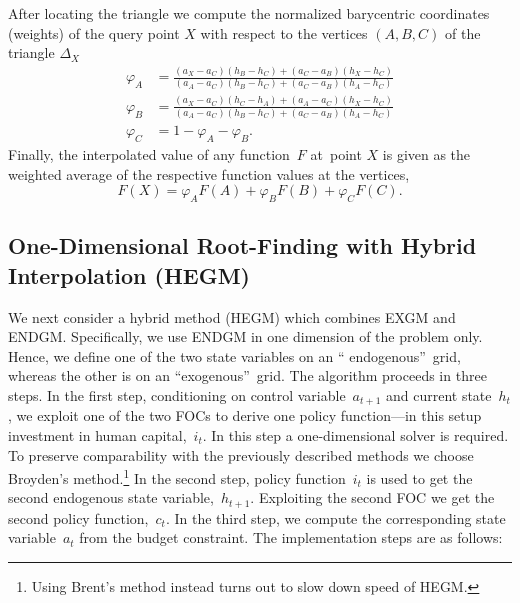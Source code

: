 \documentclass[a4paper,12pt]{article}%
\begin{document}
After locating the triangle we compute the normalized barycentric coordinates
(weights) of the query point $X$ with respect to the vertices $(A,B,C)$ of the
triangle $\Delta_{X}$%
\begin{align*}
\varphi_{A}  &  =\frac{\left(  a_{X}-a_{C}\right)  \left(  h_{B}-h_{C}\right)
+\left(  a_{C}-a_{B}\right)  \left(  h_{X}-h_{C}\right)  }{\left(  a_{A}%
-a_{C}\right)  \left(  h_{B}-h_{C}\right)  +\left(  a_{C}-a_{B}\right)
\left(  h_{A}-h_{C}\right)  }\\
\varphi_{B}  &  =\frac{\left(  a_{X}-a_{C}\right)  \left(  h_{C}-h_{A}\right)
+\left(  a_{A}-a_{C}\right)  \left(  h_{X}-h_{C}\right)  }{\left(  a_{A}%
-a_{C}\right)  \left(  h_{B}-h_{C}\right)  +\left(  a_{C}-a_{B}\right)
\left(  h_{A}-h_{C}\right)  }\\
\varphi_{C}  &  =1-\varphi_{A}-\varphi_{B}.
\end{align*}
Finally, the interpolated value of any function~$F$ at\ point $X$ is given as
the weighted average of the respective function values at the vertices,
\[
F\left(  X\right)  =\varphi_{A}F(A)+\varphi_{B}F(B)+\varphi_{C}F(C).
\]


\subsection{One-Dimensional Root-Finding with Hybrid Interpolation (HEGM)}

We next consider a hybrid method (HEGM) which combines EXGM and ENDGM.
Specifically, we use ENDGM in one dimension of the problem only. Hence, we
define one of the two state variables on an \textquotedblleft
endogenous\textquotedblright\ grid, whereas the other is on an
\textquotedblleft exogenous\textquotedblright\ grid. The algorithm proceeds in
three steps. In the first step, conditioning on control variable~$a_{t+1}$ and
current state~$h_{t}$, we exploit one of the two FOCs to derive one policy
function---in this setup investment in human capital,~$i_{t}$. In this step a
one-dimensional solver is required. To preserve comparability with the
previously described methods we choose Broyden's method.\footnote{Using
Brent's method instead turns out to slow down speed of HEGM.} In the second
step, policy function~$i_{t}$ is used to get the second endogenous state
variable,~$h_{t+1}$. Exploiting the second FOC we get the second policy
function,~$c_{t}$. In the third step, we compute the corresponding state
variable~$a_{t}$ from the budget constraint. The implementation steps are as follows:
\end{document}
